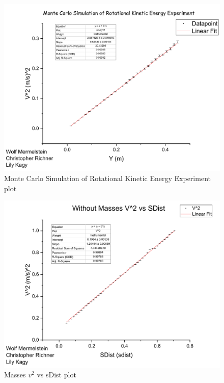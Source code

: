 \documentclass[coverpage]{article}
\begin{document}
	\begin{figure}[h]
		\label{fig:monte-carlo-simulation}
		\centering
		\caption{Monte Carlo Simulation of Rotational Kinetic Energy Experiment plot}
		\includegraphics[width=6in]{plots/monteCarloPlot.pdf}
	\end{figure}
		
	\begin{figure}[h]
		\label{fig:plot-without-masses}
		\centering
		\caption{Masses $v^2$ vs sDist plot}
		\includegraphics[width=6in]{plots/withMassesPlot.pdf}
	\end{figure}
		
\end{document}
